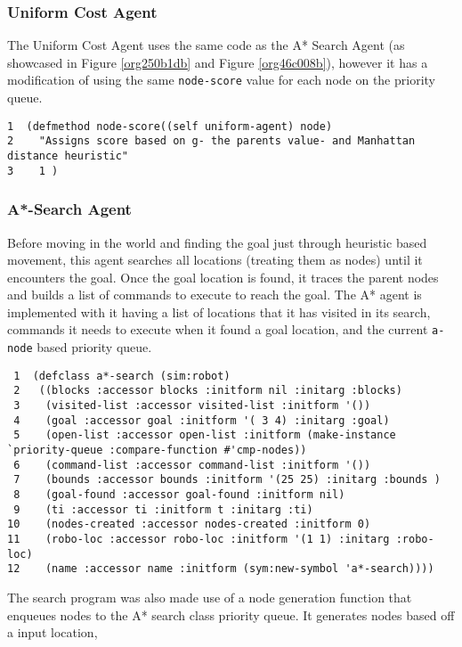 \documentclass[11pt]{article}
\begin{document}
\subsubsection{Uniform Cost Agent}
\label{sec:org5373bbe}
The Uniform Cost Agent uses the same code as the A* Search Agent (as showcased in Figure \ref{org250b1db} and Figure \ref{org46c008b}),
however it has a modification of using the same \texttt{node-score} value for each node on the priority queue.

\begin{verbatim}
1  (defmethod node-score((self uniform-agent) node)
2    "Assigns score based on g- the parents value- and Manhattan distance heuristic"
3    1 )
\end{verbatim}
\subsubsection{A*-Search Agent}
\label{sec:org5931d51}
Before moving in the world and finding the goal just through heuristic based movement,
this agent searches all locations (treating them as nodes) until it encounters the goal. Once the
goal location is found, it traces the parent nodes and builds a list of commands to execute to reach the goal.
The A* agent is implemented with it having a list of locations that it has visited in its search,
commands it needs to execute when it found a goal location, and the current \texttt{a-node} based priority queue.
\begin{verbatim}
 1  (defclass a*-search (sim:robot)
 2   ((blocks :accessor blocks :initform nil :initarg :blocks)
 3    (visited-list :accessor visited-list :initform '())
 4    (goal :accessor goal :initform '( 3 4) :initarg :goal)
 5    (open-list :accessor open-list :initform (make-instance `priority-queue :compare-function #'cmp-nodes))
 6    (command-list :accessor command-list :initform '())
 7    (bounds :accessor bounds :initform '(25 25) :initarg :bounds )
 8    (goal-found :accessor goal-found :initform nil)
 9    (ti :accessor ti :initform t :initarg :ti)
10    (nodes-created :accessor nodes-created :initform 0)
11    (robo-loc :accessor robo-loc :initform '(1 1) :initarg :robo-loc)
12    (name :accessor name :initform (sym:new-symbol 'a*-search))))
\end{verbatim}
The search program was also made use of a node generation function that enqueues
nodes to the A* search class priority queue. It generates nodes based off a input location,
\end{document}
